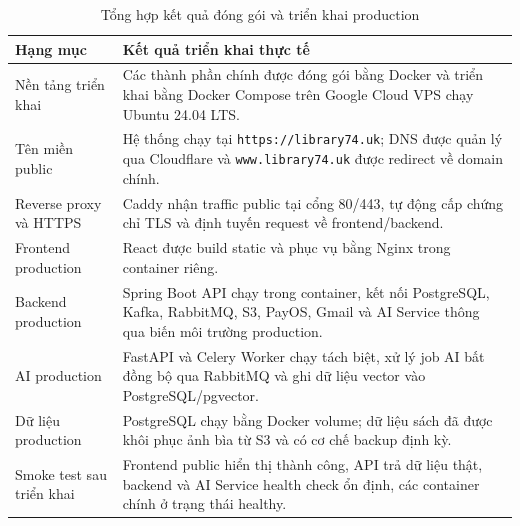 \begin{table}[H]
\centering
\small %
\setlength{\tabcolsep}{8pt} %
\renewcommand{\arraystretch}{1.4} %

\begin{tabularx}{\textwidth}{|p{3.5cm}|X|}
\hline
\textbf{Hạng mục} & \textbf{Kết quả triển khai thực tế} \\
\hline
Nền tảng triển khai &
Các thành phần chính được đóng gói bằng Docker và triển khai bằng Docker Compose trên Google Cloud VPS chạy Ubuntu 24.04 LTS. \\
\hline
Tên miền public &
Hệ thống chạy tại \texttt{https://library74.uk}; DNS được quản lý qua Cloudflare và \texttt{www.library74.uk} được redirect về domain chính. \\
\hline
Reverse proxy và HTTPS &
Caddy nhận traffic public tại cổng 80/443, tự động cấp chứng chỉ TLS và định tuyến request về frontend/backend. \\
\hline
Frontend production &
React được build static và phục vụ bằng Nginx trong container riêng. \\
\hline
Backend production &
Spring Boot API chạy trong container, kết nối PostgreSQL, Kafka, RabbitMQ, S3, PayOS, Gmail và AI Service thông qua biến môi trường production. \\
\hline
AI production &
FastAPI và Celery Worker chạy tách biệt, xử lý job AI bất đồng bộ qua RabbitMQ và ghi dữ liệu vector vào PostgreSQL/pgvector. \\
\hline
Dữ liệu production &
PostgreSQL chạy bằng Docker volume; dữ liệu sách đã được khôi phục ảnh bìa từ S3 và có cơ chế backup định kỳ. \\
\hline
Smoke test sau triển khai &
Frontend public hiển thị thành công, API trả dữ liệu thật, backend và AI Service health check ổn định, các container chính ở trạng thái healthy. \\
\hline
\end{tabularx}
\caption{Tổng hợp kết quả đóng gói và triển khai production}
\label{tab:conclusion_deployment_results}
\end{table}
